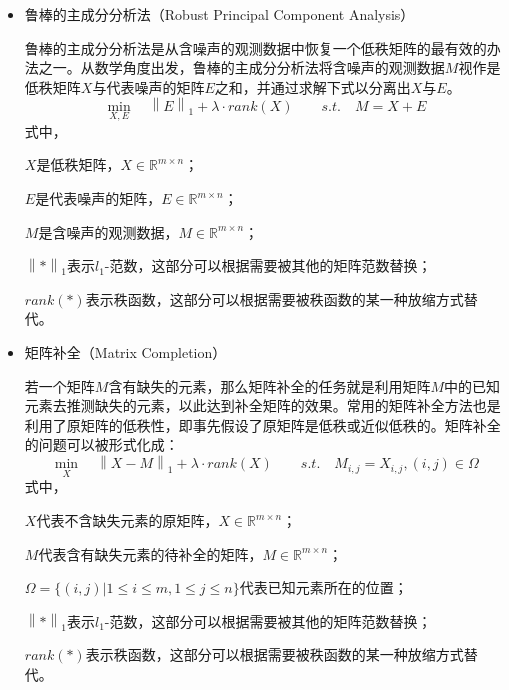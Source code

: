 \documentclass[12pt, a4paper]{article}
\begin{document}
\begin{itemize}
\item 鲁棒的主成分分析法（Robust Principal Component Analysis）
\par 鲁棒的主成分分析法是从含噪声的观测数据中恢复一个低秩矩阵的最有效的办法之一。从数学角度出发，鲁棒的主成分分析法将含噪声的观测数据$M$视作是低秩矩阵$X$与代表噪声的矩阵$E$之和，并通过求解下式以分离出$X$与$E$。
\begin{displaymath}
\min\limits_{X,E}\quad \left\|E\right\|_1 + \lambda \cdot rank(X) \qquad s.t.\quad M=X+E
\end{displaymath}
式中，
\par$X$是低秩矩阵，$X \in \mathbb{R}^{m \times n}$；
\par$E$是代表噪声的矩阵，$E \in \mathbb{R}^{m \times n}$；
\par$M$是含噪声的观测数据，$M \in \mathbb{R}^{m \times n}$；
\par$\left\|*\right\|_1$表示$l_1$-范数，这部分可以根据需要被其他的矩阵范数替换；
\par$rank(*)$表示秩函数，这部分可以根据需要被秩函数的某一种放缩方式替代。
\item 矩阵补全（Matrix Completion）
\par 若一个矩阵$M$含有缺失的元素，那么矩阵补全的任务就是利用矩阵$M$中的已知元素去推测缺失的元素，以此达到补全矩阵的效果。常用的矩阵补全方法也是利用了原矩阵的低秩性，即事先假设了原矩阵是低秩或近似低秩的。矩阵补全的问题可以被形式化成：
\begin{displaymath}
\min\limits_{X}\quad \left\|X-M\right\|_1 + \lambda \cdot rank(X) \qquad s.t.\quad M_{i,j}=X_{i,j}, (i,j)\in\Omega
\end{displaymath}
式中，
\par$X$代表不含缺失元素的原矩阵，$X \in \mathbb{R}^{m \times n}$；
\par$M$代表含有缺失元素的待补全的矩阵，$M \in \mathbb{R}^{m \times n}$；
\par$\Omega=\{(i,j)|1\leq i \leq m, 1\leq j \leq n\}$代表已知元素所在的位置；
\par$\left\|*\right\|_1$表示$l_1$-范数，这部分可以根据需要被其他的矩阵范数替换；
\par$rank(*)$表示秩函数，这部分可以根据需要被秩函数的某一种放缩方式替代。
		
		

\end{itemize}
\end{document}
